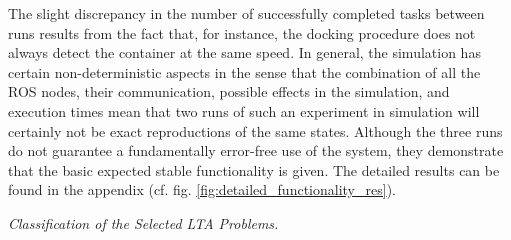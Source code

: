 \documentclass[english, master, utf8]{base/thesis_KBS}
\begin{document}
\noindent
The slight discrepancy in the number of successfully completed tasks between runs results from the fact that, for instance, the docking procedure does not always detect the container
at the same speed. In general, the simulation has certain non-deterministic aspects in the sense that the combination of all the ROS nodes, their communication, possible effects in
the simulation, and execution times mean that two runs of such an experiment in simulation will certainly not be exact reproductions of the same states. Although the three runs do not
guarantee a fundamentally error-free use of the system, they demonstrate that the basic expected stable functionality is given.
The detailed results can be found in the appendix (cf. fig. \ref{fig:detailed_functionality_res}).\newline

\noindent
\textit{Classification of the Selected LTA Problems.}\newline
\end{document}
